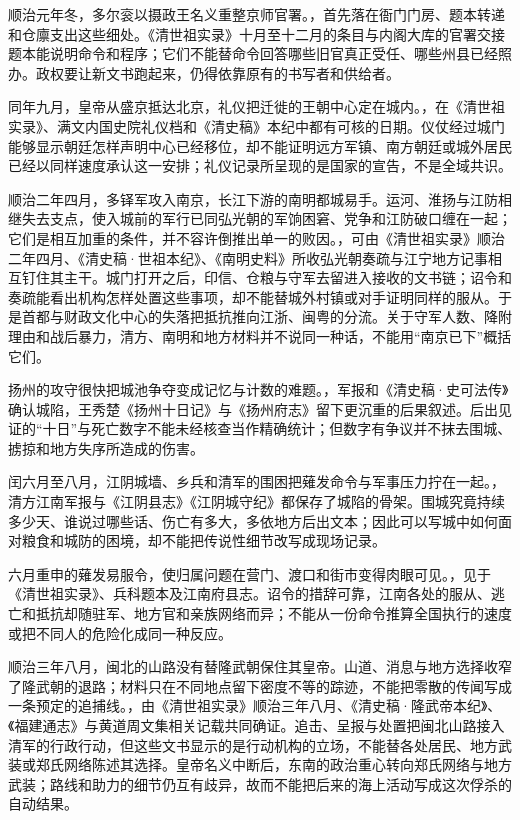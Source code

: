 顺治元年冬，多尔衮以摄政王名义重整京师官署。，首先落在衙门门房、题本转递和仓廪支出这些细处。《清世祖实录》十月至十二月的条目与内阁大库的官署交接题本能说明命令和程序；它们不能替命令回答哪些旧官真正受任、哪些州县已经照办。政权要让新文书跑起来，仍得依靠原有的书写者和供给者。

同年九月，皇帝从盛京抵达北京，礼仪把迁徙的王朝中心定在城内。，在《清世祖实录》、满文内国史院礼仪档和《清史稿》本纪中都有可核的日期。仪仗经过城门能够显示朝廷怎样声明中心已经移位，却不能证明远方军镇、南方朝廷或城外居民已经以同样速度承认这一安排；礼仪记录所呈现的是国家的宣告，不是全域共识。

顺治二年四月，多铎军攻入南京，长江下游的南明都城易手。运河、淮扬与江防相继失去支点，使入城前的军行已同弘光朝的军饷困窘、党争和江防破口缠在一起；它们是相互加重的条件，并不容许倒推出单一的败因。，可由《清世祖实录》顺治二年四月、《清史稿·世祖本纪》、《南明史料》所收弘光朝奏疏与江宁地方记事相互钉住其主干。城门打开之后，印信、仓粮与守军去留进入接收的文书链；诏令和奏疏能看出机构怎样处置这些事项，却不能替城外村镇或对手证明同样的服从。于是首都与财政文化中心的失落把抵抗推向江浙、闽粤的分流。关于守军人数、降附理由和战后暴力，清方、南明和地方材料并不说同一种话，不能用“南京已下”概括它们。

扬州的攻守很快把城池争夺变成记忆与计数的难题。，军报和《清史稿·史可法传》确认城陷，王秀楚《扬州十日记》与《扬州府志》留下更沉重的后果叙述。后出见证的“十日”与死亡数字不能未经核查当作精确统计；但数字有争议并不抹去围城、掳掠和地方失序所造成的伤害。

闰六月至八月，江阴城墙、乡兵和清军的围困把薙发命令与军事压力拧在一起。，清方江南军报与《江阴县志》《江阴城守纪》都保存了城陷的骨架。围城究竟持续多少天、谁说过哪些话、伤亡有多大，多依地方后出文本；因此可以写城中如何面对粮食和城防的困境，却不能把传说性细节改写成现场记录。

六月重申的薙发易服令，使归属问题在营门、渡口和街市变得肉眼可见。，见于《清世祖实录》、兵科题本及江南府县志。诏令的措辞可靠，江南各处的服从、逃亡和抵抗却随驻军、地方官和亲族网络而异；不能从一份命令推算全国执行的速度或把不同人的危险化成同一种反应。

顺治三年八月，闽北的山路没有替隆武朝保住其皇帝。山道、消息与地方选择收窄了隆武朝的退路；材料只在不同地点留下密度不等的踪迹，不能把零散的传闻写成一条预定的追捕线。，由《清世祖实录》顺治三年八月、《清史稿·隆武帝本纪》、《福建通志》与黄道周文集相关记载共同确证。追击、呈报与处置把闽北山路接入清军的行政行动，但这些文书显示的是行动机构的立场，不能替各处居民、地方武装或郑氏网络陈述其选择。皇帝名义中断后，东南的政治重心转向郑氏网络与地方武装；路线和助力的细节仍互有歧异，故而不能把后来的海上活动写成这次俘杀的自动结果。

